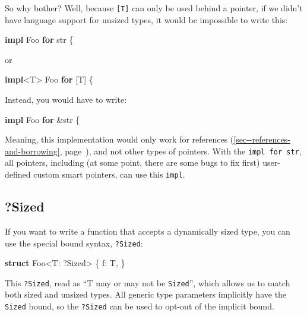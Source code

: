 \documentclass[a4paper,]{book}
\renewcommand*{\hyperlink}[2]{%
 #2 (\autoref{#1}, page~\pageref{#1})}
\newenvironment{Shaded}{\begin{snugshade}}{\end{snugshade}}
\newcommand{\KeywordTok}[1]{\textcolor[rgb]{0.13,0.29,0.53}{\textbf{{#1}}}}
\newcommand{\DataTypeTok}[1]{\textcolor[rgb]{0.13,0.29,0.53}{{#1}}}
\newcommand{\BuiltInTok}[1]{{#1}}
\newcommand{\NormalTok}[1]{{#1}}
\begin{document}
So why bother? Well, because \texttt{{[}T{]}} can only be used behind a
pointer, if we didn't have language support for unsized types, it would
be impossible to write this:

\begin{Shaded}
\begin{Highlighting}[]
\KeywordTok{impl} \NormalTok{Foo }\KeywordTok{for} \DataTypeTok{str} \NormalTok{\{}
\end{Highlighting}
\end{Shaded}

or

\begin{Shaded}
\begin{Highlighting}[]
\KeywordTok{impl}\NormalTok{<T> Foo }\KeywordTok{for} \NormalTok{[T] \{}
\end{Highlighting}
\end{Shaded}

Instead, you would have to write:

\begin{Shaded}
\begin{Highlighting}[]
\KeywordTok{impl} \NormalTok{Foo }\KeywordTok{for} \NormalTok{&}\DataTypeTok{str} \NormalTok{\{}
\end{Highlighting}
\end{Shaded}

Meaning, this implementation would only work for
\protect\hyperlink{sec--references-and-borrowing}{references}, and not
other types of pointers. With the \texttt{impl\ for\ str}, all pointers,
including (at some point, there are some bugs to fix first) user-defined
custom smart pointers, can use this \texttt{impl}.

\subsection{?Sized}\label{sized}

If you want to write a function that accepts a dynamically sized type,
you can use the special bound syntax, \texttt{?Sized}:

\begin{Shaded}
\begin{Highlighting}[]
\KeywordTok{struct} \NormalTok{Foo<T: ?}\BuiltInTok{Sized}\NormalTok{> \{}
    \NormalTok{f: T,}
\NormalTok{\}}
\end{Highlighting}
\end{Shaded}

This \texttt{?Sized}, read as ``T may or may not be \texttt{Sized}'',
which allows us to match both sized and unsized types. All generic type
parameters implicitly have the \texttt{Sized} bound, so the
\texttt{?Sized} can be used to opt-out of the implicit bound.
\end{document}
